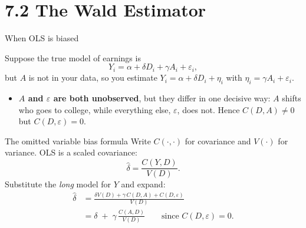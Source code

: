 \documentclass[
  11pt,
  ignorenonframetext,
  aspectratio=169,
]{beamer}
\providecommand{\tightlist}{%
  \setlength{\itemsep}{0pt}\setlength{\parskip}{0pt}}
\begin{document}
\section{7.2 The Wald Estimator}\label{the-wald-estimator}

\begin{frame}{When OLS is biased}
\protect{}\label{when-ols-is-biased}
\begin{center}
\end{center}

\vspace{-0.5em}

Suppose the true model of earnings is \[
Y_i = \alpha + \delta D_i + \gamma A_i + \varepsilon_i,
\] but \(A\) is not in your data, so you estimate
\(Y_i = \alpha + \delta D_i + \eta_i\) with
\(\eta_i = \gamma A_i + \varepsilon_i\).

\begin{itemize}
\tightlist
\item
  \textbf{\(A\) and \(\varepsilon\) are both unobserved}, but they
  differ in one decisive way: \(A\) shifts who goes to college, while
  everything else, \(\varepsilon\), does not. Hence \(C(D,A) \neq 0\)
  but \(C(D,\varepsilon) = 0\).
\end{itemize}
\end{frame}

\begin{frame}{The omitted variable bias formula}
\protect{}\label{the-omitted-variable-bias-formula}
Write \(C(\cdot,\cdot)\) for covariance and \(V(\cdot)\) for variance.
OLS is a scaled covariance: \[
\hat\delta = \frac{C(Y, D)}{V(D)}.
\] Substitute the \emph{long} model for \(Y\) and expand: \[
\begin{aligned}
\hat\delta
&= \frac{\delta V(D) + \gamma\,C(D,A) + C(D,\varepsilon)}{V(D)} \\[0.3em]
&= \delta \;+\; \gamma\,\frac{C(A,D)}{V(D)}
\qquad\text{since } C(D,\varepsilon) = 0 .
\end{aligned}
\]
\end{frame}
\end{document}
